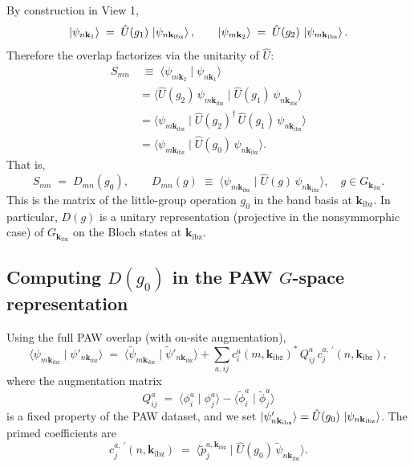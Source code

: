 \documentclass[11pt,a4paper]{article}
\newcommand{\kk}{\mathbf{k}}
\newcommand{\kibz}{\kk_{\text{ibz}}}
\newcommand{\Uhat}{\hat{U}}
\begin{document}
By construction in View 1,
\begin{equation}
\ket{\psi_{n\kk_1}} \;=\; \Uhat(g_1)\,\ket{\psi_{n\kibz}},
\qquad
\ket{\psi_{m\kk_2}} \;=\; \Uhat(g_2)\,\ket{\psi_{m\kibz}}.
\end{equation}
Therefore the overlap factorizes via the unitarity of $\Uhat$:
\begin{align}
S_{mn}
  &\;\equiv\; \langle\psi_{m\kk_2}\mid\psi_{n\kk_1}\rangle \nonumber\\
  &= \langle \Uhat(g_2)\,\psi_{m\kibz}\mid \Uhat(g_1)\,\psi_{n\kibz}\rangle \nonumber\\
  &= \langle \psi_{m\kibz}\mid \Uhat(g_2)^\dagger\,\Uhat(g_1)\,\psi_{n\kibz}\rangle \nonumber\\
  &= \langle \psi_{m\kibz}\mid \Uhat(g_0)\,\psi_{n\kibz}\rangle.
\end{align}
That is,
\begin{equation}
\boxed{\;
S_{mn} \;=\; D_{mn}(g_0),
\qquad
D_{mn}(g) \;\equiv\; \langle\psi_{m\kibz}\mid\Uhat(g)\,\psi_{n\kibz}\rangle,
\quad g\in G_{\kk_{\mathrm{ibz}}}.
\;}
\label{eq:S-as-D}
\end{equation}
This is the matrix of the little-group operation $g_0$ in the band basis at
$\kibz$. In particular, $D(g)$ is a unitary representation (projective in the
nonsymmorphic case) of $G_{\kk_{\mathrm{ibz}}}$ on the Bloch states at $\kibz$.

\subsection{Computing $D(g_0)$ in the PAW $G$-space representation}

Using the full PAW overlap (with on-site augmentation),
\begin{equation}
\langle\psi_{m\kibz}\mid\psi'_{n\kibz}\rangle
  \;=\; \langle\tilde\psi_{m\kibz}\mid\tilde\psi'_{n\kibz}\rangle
   + \sum_{a,ij} c_i^{a}(m,\kibz)^*\,Q^a_{ij}\,c_j^{a,\,\prime}(n,\kibz),
\end{equation}
where the augmentation matrix
\begin{equation}
Q^a_{ij} \;=\; \langle\phi_i^{a}\mid\phi_j^{a}\rangle - \langle\tilde\phi_i^{a}\mid\tilde\phi_j^{a}\rangle
\end{equation}
is a fixed property of the PAW dataset, and we set $\ket{\psi'_{n\kibz}} =
\Uhat(g_0)\,\ket{\psi_{n\kibz}}$. The primed coefficients are
\begin{equation}
c_j^{a,\,\prime}(n,\kibz)
  \;=\; \langle\tilde p_j^{a,\kibz}\mid\Uhat(g_0)\,\tilde\psi_{n\kibz}\rangle.
\end{equation}
\end{document}
